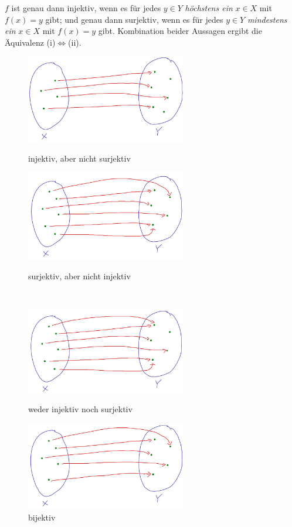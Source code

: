 \begin{bew}
    $f$ ist genau dann injektiv, wenn es für jedes $y\in Y$ \emph{höchstens ein} $x\in X$ mit $f(x)=y$ gibt; und genau dann surjektiv, wenn es für jedes $y\in Y$ \emph{mindestens ein} $x\in X$ mit $f(x)=y$ gibt. Kombination beider Aussagen ergibt die Äquivalenz (i)$\Leftrightarrow$(ii).
\end{bew}


\begin{figure}[ht]
    \begin{minipage}{.48\textwidth}
        \includegraphics[width=7cm]{./_img/injsur4.jpeg}
        \centering \caption{injektiv, aber nicht surjektiv}
    \end{minipage}
    \quad
    \begin{minipage}{.48\textwidth}
        \includegraphics[width=7cm]{./_img/injsur2.jpeg}
        \centering \caption{surjektiv, aber nicht injektiv}
    \end{minipage}
    \quad\\[1em]
    \begin{minipage}{.48\textwidth}
        \includegraphics[width=7cm]{./_img/injsur1.jpeg}
        \centering \caption{weder injektiv noch surjektiv}
    \end{minipage}
    \quad
    \begin{minipage}{.48\textwidth}
        \includegraphics[width=7cm]{./_img/injsur3.jpeg}
        \centering \caption{bijektiv}
    \end{minipage}
\end{figure}


